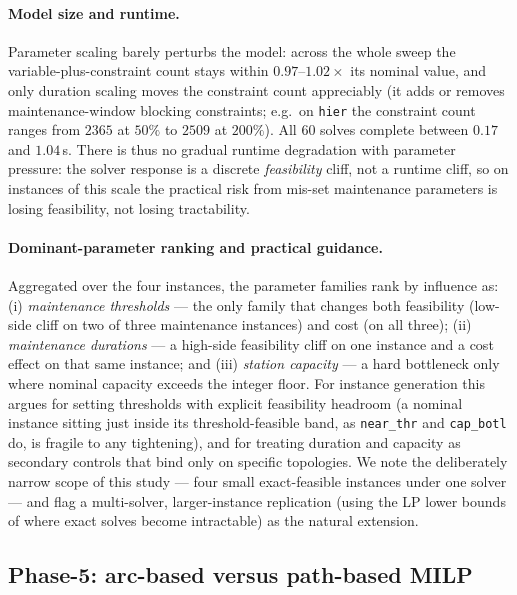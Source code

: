 \paragraph{Model size and runtime.}
Parameter scaling barely perturbs the model: across the whole sweep the
variable-plus-constraint count stays within $0.97$--$1.02\times$ its nominal
value, and only duration scaling moves the constraint count appreciably (it
adds or removes maintenance-window blocking constraints; e.g.\ on \texttt{hier}
the constraint count ranges from $2365$ at $50\%$ to $2509$ at $200\%$).  All
$60$ solves complete between $0.17$ and $1.04$\,s.  There is thus no gradual
runtime degradation with parameter pressure: the solver response is a discrete
\emph{feasibility} cliff, not a runtime cliff, so on instances of this scale the
practical risk from mis-set maintenance parameters is losing feasibility, not
losing tractability.

\paragraph{Dominant-parameter ranking and practical guidance.}
Aggregated over the four instances, the parameter families rank by influence
as: (i) \emph{maintenance thresholds} --- the only family that changes both
feasibility (low-side cliff on two of three maintenance instances) and cost
(on all three); (ii) \emph{maintenance durations} --- a high-side feasibility
cliff on one instance and a cost effect on that same instance; and
(iii) \emph{station capacity} --- a hard bottleneck only where nominal capacity
exceeds the integer floor.  For instance generation this argues for setting
thresholds with explicit feasibility headroom (a nominal instance sitting just
inside its threshold-feasible band, as \texttt{near\_thr} and
\texttt{cap\_botl} do, is fragile to any tightening), and for treating duration
and capacity as secondary controls that bind only on specific topologies.  We
note the deliberately narrow scope of this study --- four small
exact-feasible instances under one solver --- and flag a multi-solver,
larger-instance replication (using the LP lower bounds of
 where exact solves become intractable) as the
natural extension.

\subsection{Phase-5: arc-based versus path-based MILP}
\label{subsec:phase5_arc_vs_path}

